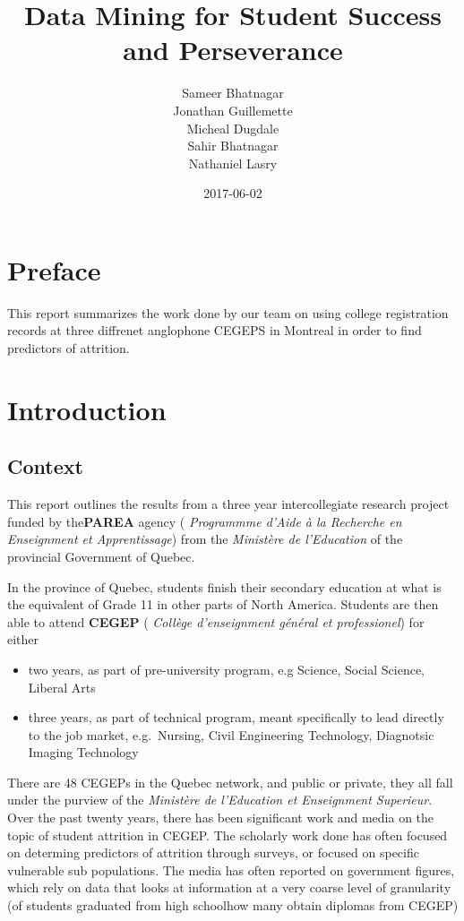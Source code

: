 \documentclass[]{book}
\title{Data Mining for Student Success and Perseverance}
\author{Sameer Bhatnagar \\ Jonathan Guillemette \\ Micheal Dugdale \\ Sahir Bhatnagar \\ Nathaniel Lasry}
\date{2017-06-02}
\providecommand{\tightlist}{%
  \setlength{\itemsep}{0pt}\setlength{\parskip}{0pt}}
\theoremstyle{definition}
\theoremstyle{definition}
\theoremstyle{remark}
\begin{document}
\maketitle

{
\setcounter{tocdepth}{1}
\tableofcontents
}
\chapter{Preface}\label{preface}

This report summarizes the work done by our team on using college
registration records at three diffrenet anglophone CEGEPS in Montreal in
order to find predictors of attrition.

\chapter{Introduction}\label{intro}

\section{Context}\label{context}

This report outlines the results from a three year intercollegiate
research project funded by the\textbf{PAREA} agency ( \emph{Programmme
d'Aide à la Recherche en Enseignment et Apprentissage}) from the
\emph{Ministère de l'Education} of the provincial Government of Quebec.

In the province of Quebec, students finish their secondary education at
what is the equivalent of Grade 11 in other parts of North America.
Students are then able to attend \textbf{CEGEP} ( \emph{Collège
d'enseignment général et professionel}) for either

\begin{itemize}
\tightlist
\item
  two years, as part of pre-university program, e.g Science, Social
  Science, Liberal Arts
\item
  three years, as part of technical program, meant specifically to lead
  directly to the job market, e.g.~Nursing, Civil Engineering
  Technology, Diagnotsic Imaging Technology
\end{itemize}

There are 48 CEGEPs in the Quebec network, and public or private, they
all fall under the purview of the \emph{Ministère de l'Education et
Enseignment Superieur}. Over the past twenty years, there has been
significant
work\citep{jorgensen2003students, jorgensen2005academic, jorgensen2009predicting, riviere1995decrocheurs, shaienks2008statcan}
and media
\citep{breton2016soleil, dion-viens2015lapresse, duchaine2017lapresse}
on the topic of student attrition in CEGEP. The scholarly work done has
often focused on determing predictors of attrition through surveys, or
focused on specific vulnerable sub populations. The media has often
reported on government figures, which rely on data that looks at
information at a very coarse level of granularity (of students graduated
from high schoolhow many obtain diplomas from CEGEP)
\end{document}
